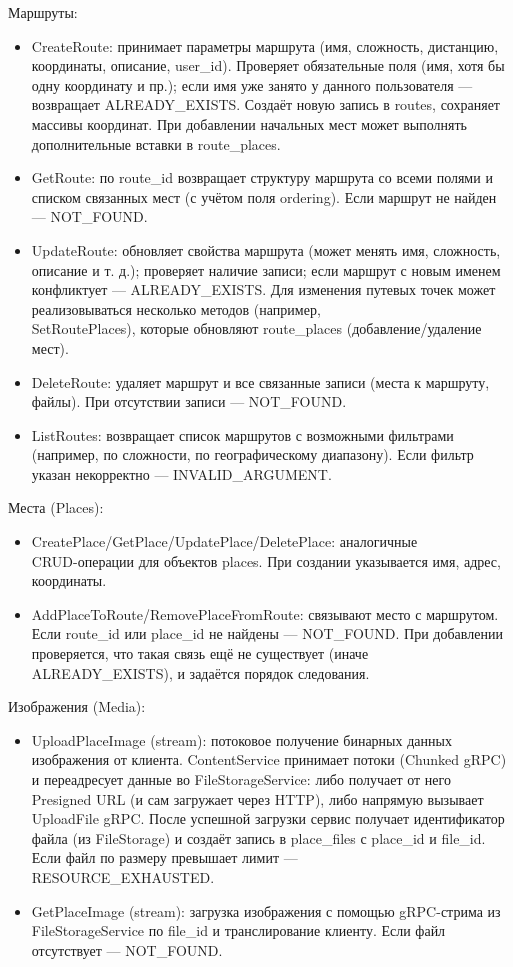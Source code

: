 Маршруты:
\begin{itemize}
    \item CreateRoute: принимает параметры маршрута (имя, сложность, дистанцию, координаты, описание, user\_id). Проверяет обязательные поля (имя, хотя бы одну координату и пр.); если имя уже занято у данного пользователя — возвращает ALREADY\_EXISTS. Создаёт новую запись в routes, сохраняет массивы координат. При добавлении начальных мест может выполнять дополнительные вставки в route\_places.
    \item GetRoute: по route\_id возвращает структуру маршрута со всеми полями и списком связанных мест (с учётом поля ordering). Если маршрут не найден — NOT\_FOUND.
    \item UpdateRoute: обновляет свойства маршрута (может менять имя, сложность, описание и т. д.); проверяет наличие записи; если маршрут с новым именем конфликтует — ALREADY\_EXISTS. Для изменения путевых точек может реализовываться несколько методов (например, \\ SetRoutePlaces), которые обновляют route\_places (добавление/удаление мест).
    \item DeleteRoute: удаляет маршрут и все связанные записи (места к маршруту, файлы). При отсутствии записи — NOT\_FOUND.
    \item ListRoutes: возвращает список маршрутов с возможными фильтрами (например, по сложности, по географическому диапазону). Если фильтр указан некорректно — INVALID\_ARGUMENT.
\end{itemize}
\noindent Места (Places):
\begin{itemize}
    \item CreatePlace/GetPlace/UpdatePlace/DeletePlace: аналогичные \\ CRUD-операции для объектов places. При создании указывается имя, адрес, координаты.
    \item AddPlaceToRoute/RemovePlaceFromRoute: связывают место с маршрутом. Если route\_id или place\_id не найдены — NOT\_FOUND. При добавлении проверяется, что такая связь ещё не существует (иначе \\ ALREADY\_EXISTS), и задаётся порядок следования.
\end{itemize}
\noindent Изображения (Media):
\begin{itemize}
    \item UploadPlaceImage (stream): потоковое получение бинарных данных изображения от клиента. ContentService принимает потоки (Chunked gRPC) и переадресует данные во FileStorageService: либо получает от него Presigned URL (и сам загружает через HTTP), либо напрямую вызывает UploadFile gRPC. После успешной загрузки сервис получает идентификатор файла (из FileStorage) и создаёт запись в place\_files с place\_id и file\_id. Если файл по размеру превышает лимит — \\ RESOURCE\_EXHAUSTED.
    \item GetPlaceImage (stream): загрузка изображения с помощью gRPC-стрима из FileStorageService по file\_id и транслирование клиенту. Если файл отсутствует — NOT\_FOUND.
\end{itemize}
